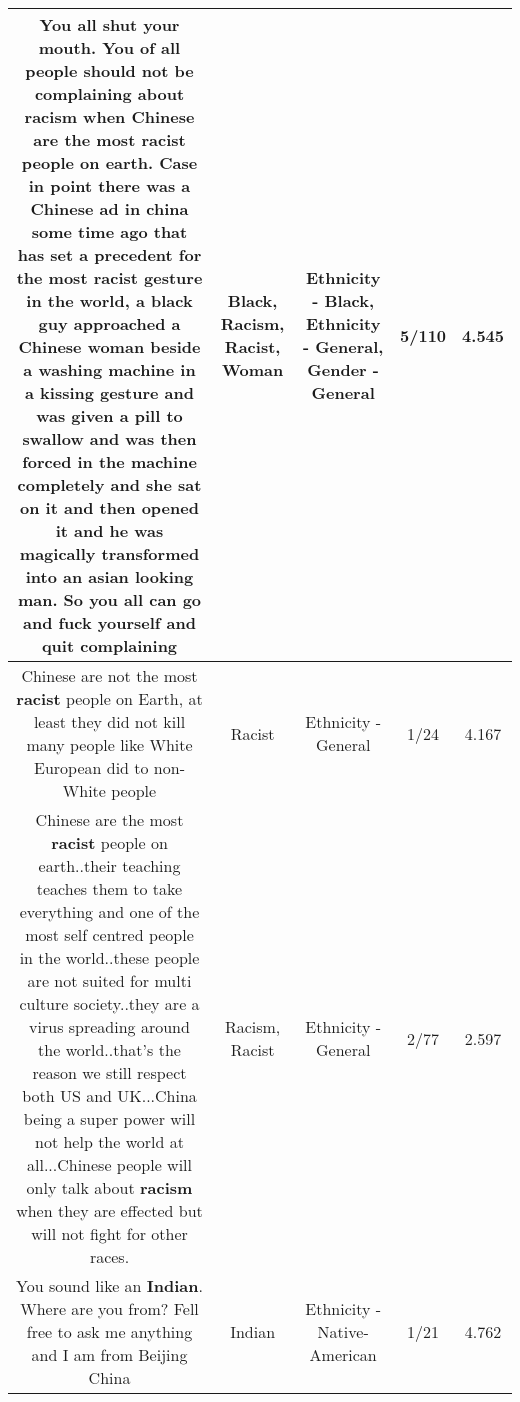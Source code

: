 \documentclass[11pt]{article}
\newlength\mylength
\begin{document}
\begin{center}
\begin{longtable}{|C{.65\mylength}|C{.30\mylength}|C{.12\mylength}|C{.12\mylength}|C{.12\mylength}|}
  \small You all shut your mouth. You of all people should not be complaining about \textbf{racism} when Chinese are the most \textbf{racist} people on earth. Case in point there was a Chinese ad in china some time ago that has set a precedent for the most \textbf{racist} gesture in the world, a \textbf{black} guy approached a Chinese \textbf{woman} beside a washing machine  in a kissing gesture and was given a pill to swallow and was then forced in the machine completely and she sat on it and then opened it and he was magically transformed into an asian looking man. So you all can go and fuck yourself and quit complaining\normalsize   & Black, Racism, Racist, Woman & Ethnicity - Black, Ethnicity - General, Gender - General & 5/110 & 4.545 \\  \hline
  \small Chinese are not the most \textbf{racist} people on Earth, at least they did not kill many people like White European did to non-White people\normalsize   & Racist & Ethnicity - General & 1/24 & 4.167 \\  \hline
  \small Chinese are the most \textbf{racist} people on earth..their teaching teaches them to take everything and one of the most self centred people in the world..these people are not suited for multi culture society..they are a virus spreading around the world..that's the reason we still respect both US and UK...China being a super power will not help the world at all...Chinese people will only talk about \textbf{racism} when they are effected but will not fight for other races.\normalsize   & Racism, Racist & Ethnicity - General & 2/77 & 2.597 \\  \hline
  \small You sound like an \textbf{Indian}. Where are you from? Fell free to ask me anything and I am from Beijing China\normalsize   & Indian & Ethnicity - Native-American & 1/21 & 4.762 \\  \hline

\end{longtable}
\end{center}
\end{document}
